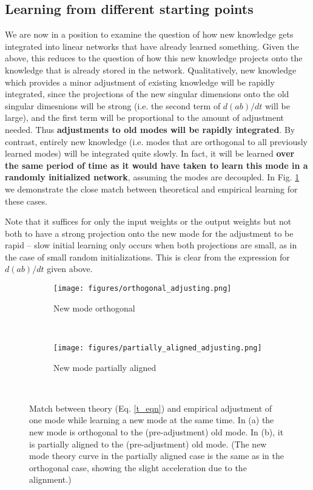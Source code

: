 \documentclass{article}
\begin{document}
\subsection{Learning from different starting points}
We are now in a position to examine the question of how new knowledge gets integrated into linear networks that have already learned something. Given the above, this reduces to the question of how this new knowledge projects onto the knowledge that is already stored in the network. Qualitatively, new knowledge which provides a minor adjustment of existing knowledge will be rapidly integrated, since the projections of the new singular dimensions onto the old singular dimesnions will be strong (i.e. the second term of $d(ab)/dt$ will be large), and the first term will be proportional to the amount of adjustment needed. Thus \textbf{adjustments to old modes will be rapidly integrated}. By contrast, entirely new knowledge (i.e. modes that are orthogonal to all previously learned modes) will be integrated quite slowly. In fact, it will be learned \textbf{over the same period of time as it would have taken to learn this mode in a randomly initialized network}, assuming the modes are decoupled. In Fig. \ref{orth_adj_fig} we demonstrate the close match between theoretical and empirical learning for these cases. \par
Note that it suffices for only the input weights or the output weights but not both to have a strong projection onto the new mode for the adjustment to be rapid -- slow initial learning only occurs when both projections are small, as in the case of small random initializations. This is clear from the expression for ${d(ab)}/{dt}$ given above. \par
\begin{figure}
\centering
\begin{subfigure}[b]{0.49\textwidth}
\texttt{[image: figures/orthogonal\_adjusting.png]}
\caption{New mode orthogonal} \label{orth_adj_fig}
\end{subfigure}~%
\begin{subfigure}[b]{0.49\textwidth}
\texttt{[image: figures/partially\_aligned\_adjusting.png]}
\caption{New mode partially aligned} \label{al_adj_fig}
\end{subfigure}~%
\caption{Match between theory (Eq. \ref{t_eqn}) and empirical adjustment of one mode while learning a new mode at the same time. In (a) the new mode is orthogonal to the (pre-adjustment) old mode. In (b), it is partially aligned to the (pre-adjustment) old mode. (The new mode theory curve in the partially aligned case is the same as in the orthogonal case, showing the slight acceleration due to the alignment.)}
\label{adjustment_fig}
\end{figure}
\end{document}
